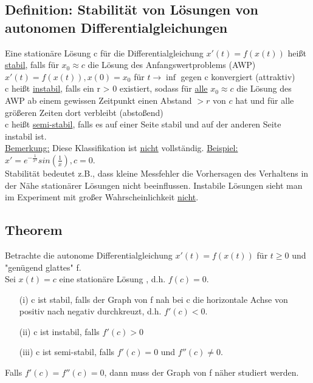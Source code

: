 \documentclass[12pt,a4paper]{article}
\newcommand{\DGL}{Differentialgleichung }
\newcommand{\DGLs}{Differentialgleichungen }
\newcommand{\Lsg}{Lösung }
\newcommand{\LSG}{Lösungen }
\begin{document}
\subsection{Definition: Stabilität von \LSG von autonomen \DGLs}
Eine stationäre \Lsg c für die \DGL $x'(t) = f(x(t))$ heißt \underline{stabil}, falls für $x_0 \approx c$ die \Lsg des Anfangswertproblems (AWP) $x'(t) = f(x(t)), x(0) = x_0$ für $t \rightarrow \inf$ gegen c konvergiert (attraktiv) \\
c heißt \underline{instabil}, falls ein r > 0 existiert, sodass für \underline{alle} $x_0 \approx c$ die \Lsg des AWP ab einem gewissen Zeitpunkt einen Abstand $>r$ von $c$ hat und für alle größeren Zeiten dort verbleibt (abstoßend) \\
c heißt \underline{semi-stabil}, falls es auf einer Seite stabil und auf der anderen Seite instabil ist. \\
\underline{Bemerkung:} Diese Klassifikation ist \underline{nicht} vollständig. \underline{Beispiel:} $x'=e^{-\frac{1}{x^2}}sin(\frac{1}{x}), c=0$. \\
Stabilität bedeutet z.B., dass kleine Messfehler die Vorhersagen des Verhaltens in der Nähe stationärer \LSG nicht beeinflussen. Instabile \LSG sieht man im Experiment mit großer Wahrscheinlichkeit \underline{nicht}.
\subsection{Theorem}
Betrachte die autonome \DGL $x'(t) = f(x(t))$ für $t \geq 0$ und "genügend glattes" f. \\
Sei $x(t) = c$ eine stationäre \Lsg, d.h. $f(c)=0$.
\begin{itemize}
\item[(i)] c ist stabil, falls der Graph von f nah bei c die horizontale Achse von positiv nach negativ durchkreuzt, d.h. $f'(c) < 0$.
\item[(ii)] c ist instabil, falls $f'(c) > 0$
\item[(iii)] c ist semi-stabil, falls $f'(c) = 0$ und $f''(c) \neq 0$.
\end{itemize}
Falls $f'(c) = f''(c) = 0$, dann muss der Graph von f näher studiert werden.
\end{document}
